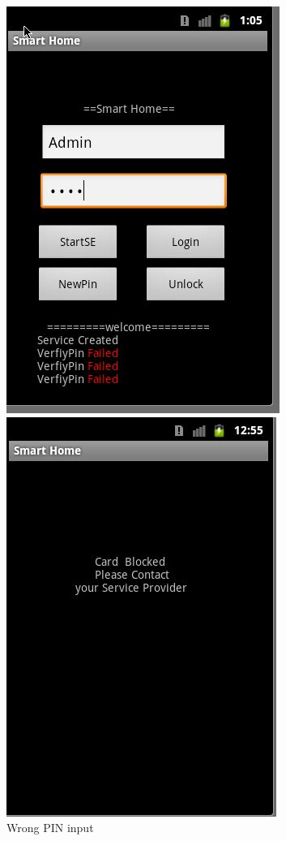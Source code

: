 \begin{figure}[!htb]
\begin{minipage}{0.49\linewidth}
  \includegraphics[width=0.8\linewidth]{Images/impl/3failed.jpg}
  \caption{Wrong PIN input}
  \label{fig:sub1}
\end{minipage}
    \hfill
\begin{minipage}{0.49\linewidth}
  \includegraphics[width=0.8\linewidth]{Images/impl/UI3.jpg}

\end{minipage}
\end{figure}
